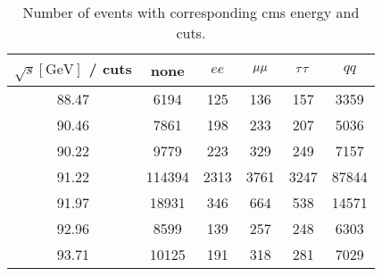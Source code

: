 \begin{table}[ht]
	\centering
	\begin{tabular}{c|ccccc}
		\toprule
		$\sqrt{s} [\si{\giga\eV}]$ / cuts& none & $ee$ & $\mu\mu$ & $\tau\tau$ & $qq$ \\
	\midrule
	\num{88.47} & \num{6194} & \num{125} & \num{136} & \num{157} & \num{3359}\\
	\num{90.46} & \num{7861} & \num{198} & \num{233} & \num{207} & \num{5036}\\
	\num{90.22} & \num{9779} & \num{223} & \num{329} & \num{249} & \num{7157}\\
	\num{91.22} & \num{114394} & \num{2313} & \num{3761} & \num{3247} & \num{87844}\\
	\num{91.97} & \num{18931} & \num{346} & \num{664} & \num{538} & \num{14571}\\
	\num{92.96} & \num{8599} & \num{139} & \num{257} & \num{248} & \num{6303}\\
	\num{93.71} & \num{10125} & \num{191} & \num{318} & \num{281} & \num{7029}\\
	\bottomrule
	\end{tabular}
	\caption{Number of events with corresponding cms energy and cuts.}
	\label{tab:510raw}
\end{table}


